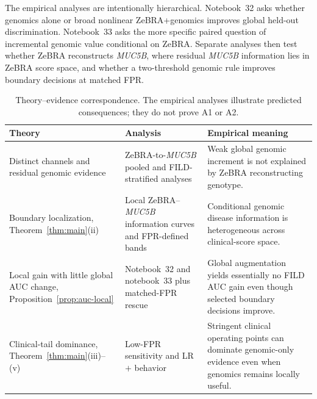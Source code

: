 \documentclass[journal]{IEEEtran}
\begin{document}
The empirical analyses are intentionally hierarchical. Notebook~32 asks whether genomics alone or broad nonlinear ZeBRA+genomics improves global held-out discrimination. Notebook~33 asks the more specific paired question of incremental genomic value conditional on ZeBRA. Separate analyses then test whether ZeBRA reconstructs \textit{MUC5B}, where residual \textit{MUC5B} information lies in ZeBRA score space, and whether a two-threshold genomic rule improves boundary decisions at matched FPR.

\begin{table}[!t]
\caption{Theory--evidence correspondence. The empirical analyses illustrate predicted consequences; they do not prove A1 or A2.}
\label{tab:theory-evidence-map}
\centering\footnotesize\setlength{\tabcolsep}{5pt}
\begin{tabular}{p{}p{}p{}}
\toprule
Theory & Analysis & Empirical meaning\\
\midrule
Distinct channels and residual genomic evidence & ZeBRA-to-\textit{MUC5B} pooled and FILD-stratified analyses & Weak global genomic increment is not explained by ZeBRA reconstructing genotype.\\
Boundary localization, Theorem~\ref{thm:main}(ii) & Local ZeBRA--\textit{MUC5B} information curves and FPR-defined bands & Conditional genomic disease information is heterogeneous across clinical-score space.\\
Local gain with little global AUC change, Proposition~\ref{prop:auc-local} & Notebook~32 and notebook~33 plus matched-FPR rescue & Global augmentation yields essentially no FILD AUC gain even though selected boundary decisions improve.\\
Clinical-tail dominance, Theorem~\ref{thm:main}(iii)--(v) & Low-FPR sensitivity and LR$+$ behavior & Stringent clinical operating points can dominate genomic-only evidence even when genomics remains locally useful.\\
\bottomrule
\end{tabular}
\end{table}

\globalauc
{}\incremental
{}\localbands
{}\rescuedata
{}\lowfprdata
{}\lowenv
\end{document}
